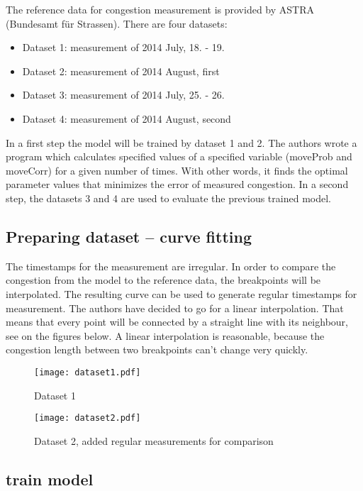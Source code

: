 
The reference data for congestion measurement is provided by ASTRA (Bundesamt für Strassen). There are four datasets: 
\begin{itemize}
\item Dataset 1: measurement of 2014 July, 18. - 19.
\item Dataset 2: measurement of 2014 August, first
\item Dataset 3: measurement of 2014 July, 25. - 26.
\item Dataset 4: measurement of 2014 August, second
\end{itemize}

In a first step the model will be trained by dataset 1 and 2. The authors wrote a program which calculates specified values of a specified variable (moveProb and moveCorr) for a given number of times. With other words, it finds the optimal parameter values that minimizes the error of measured congestion. In a second step, the datasets 3 and 4 are used to evaluate the previous trained model.

\subsection{Preparing dataset -- curve fitting}
The timestamps for the measurement are irregular. In order to compare the congestion from the model to the reference data, the breakpoints will be interpolated. The resulting curve can be used to generate regular timestamps for measurement. The authors have decided to go for a linear interpolation. That means that every point will be connected by a straight line with its neighbour, see on the figures below. A linear interpolation is reasonable, because the congestion length between two breakpoints can't change very quickly.


\begin{figure}[h]\centering
\texttt{[image: dataset1.pdf]}
\caption{Dataset 1}
\end{figure}
\begin{figure}[h]\centering
\texttt{[image: dataset2.pdf]}
\caption{Dataset 2, added regular measurements for comparison}
\end{figure}

\subsection{train model}
